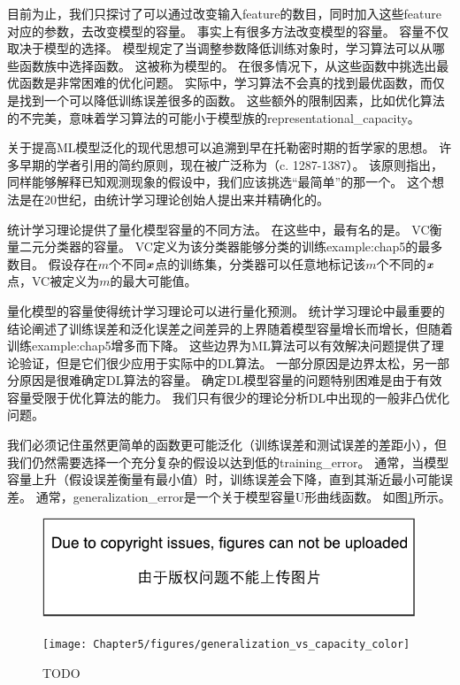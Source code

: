 
目前为止，我们只探讨了可以通过改变输入\gls{feature}的数目，同时加入这些\gls{feature}对应的参数，去改变模型的容量。
事实上有很多方法改变模型的容量。
容量不仅取决于模型的选择。
模型规定了当调整参数降低训练对象时，学习算法可以从哪些函数族中选择函数。
这被称为模型的。
在很多情况下，从这些函数中挑选出最优函数是非常困难的优化问题。
实际中，学习算法不会真的找到最优函数，而仅是找到一个可以降低训练误差很多的函数。
这些额外的限制因素，比如优化算法的不完美，意味着学习算法的可能小于模型族的\gls{representational_capacity}。


关于提高\gls{ML}模型泛化的现代思想可以追溯到早在托勒密时期的哲学家的思想。
许多早期的学者引用的简约原则，现在被广泛称为（c. 1287-1387）。
该原则指出，同样能够解释已知观测现象的假设中，我们应该挑选``最简单''的那一个。
这个想法是在20世纪，由统计学习理论创始人提出来并精确化的\citep{Vapnik71,Vapnik82,Blumer-et-al-1989,Vapnik95}。

统计学习理论提供了量化模型容量的不同方法。
在这些中，最有名的是。
\gls{VC}衡量二元分类器的容量。
\gls{VC}定义为该分类器能够分类的训练\gls{example:chap5}的最多数目。
假设存在$m$个不同$\boldsymbol{\mathit{x}}$点的训练集，分类器可以任意地标记该$m$个不同的$\boldsymbol{\mathit{x}}$点，\gls{VC}被定义为$m$的最大可能值。

量化模型的容量使得统计学习理论可以进行量化预测。
统计学习理论中最重要的结论阐述了训练误差和泛化误差之间差异的上界随着模型容量增长而增长，但随着训练\gls{example:chap5}增多而下降\citep{Vapnik71,Vapnik82,Blumer-et-al-1989,Vapnik95}。
这些边界为\gls{ML}算法可以有效解决问题提供了理论验证，但是它们很少应用于实际中的\gls{DL}算法。
一部分原因是边界太松，另一部分原因是很难确定\gls{DL}算法的容量。
确定\gls{DL}模型容量的问题特别困难是由于有效容量受限于优化算法的能力。
我们只有很少的理论分析\gls{DL}中出现的一般非凸优化问题。

我们必须记住虽然更简单的函数更可能泛化（训练误差和测试误差的差距小），但我们仍然需要选择一个充分复杂的假设以达到低的\gls{training_error}。
通常，当模型容量上升（假设误差衡量有最小值）时，训练误差会下降，直到其渐近最小可能误差。
通常，\gls{generalization_error}是一个关于模型容量U形曲线函数。
如图\ref{fig:chap5_generalization_vs_capacity}所示。

\begin{figure}[!htb]
\ifOpenSource
\centerline{\includegraphics{figure.pdf}}
\else
\centerline{\texttt{[image: Chapter5/figures/generalization\_vs\_capacity\_color]}}
\fi
\caption{TODO}
\label{fig:chap5_generalization_vs_capacity}
\end{figure}

